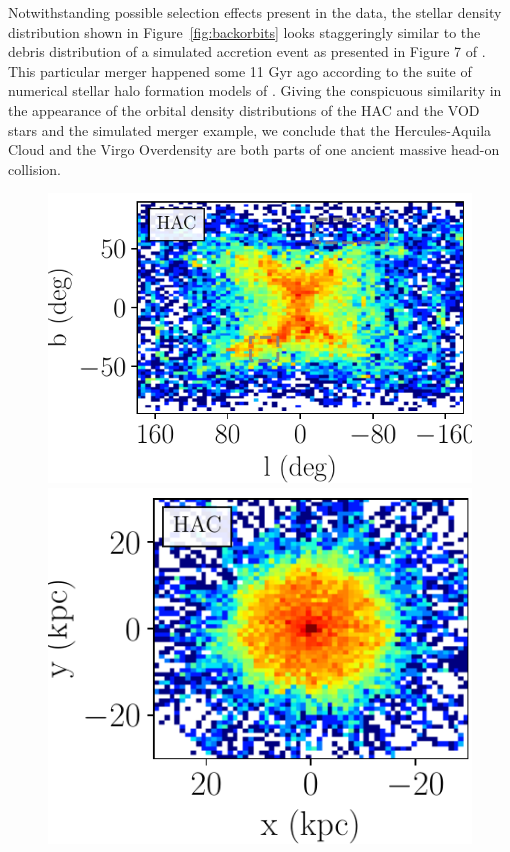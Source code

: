 \documentclass[fleqn,usenatbib]{mnras}
\begin{document}
Notwithstanding possible selection effects present in the data, the
stellar density distribution shown in Figure~\ref{fig:backorbits}
looks staggeringly similar to the debris distribution of a simulated
accretion event as presented in Figure 7 of \citet{Simion2018}. This
particular merger happened some 11 Gyr ago according to the suite of
numerical stellar halo formation models of \citet{Bu05}. Giving the
conspicuous similarity in the appearance of the orbital density
distributions of the HAC and the VOD stars and the simulated merger
example, we conclude that the Hercules-Aquila Cloud and the Virgo
Overdensity are both parts of one ancient massive head-on collision.

%
\begin{figure}
	     \includegraphics[scale=0.302]{HAC_orbits_8Gyrs_lb_defaultmass.pdf}
             \includegraphics[scale=0.302]{HAC_orbits_8Gyrs_xy_defaultmass.pdf}

\end{figure}
\end{document}
